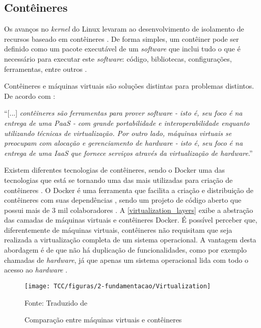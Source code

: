 \subsection{Contêineres}

Os avanços no \textit{kernel} do Linux levaram ao desenvolvimento de isolamento de recursos baseado em contêineres \cite{containersXvms}. De forma simples, um contêiner pode ser definido como um pacote executável de um \textit{software} que inclui tudo o que é necessário para executar este \textit{software}: código, bibliotecas, configurações, ferramentas, entre outros \cite{aboutcontainer}. 

Contêineres e máquinas virtuais são soluções distintas para problemas distintos. De acordo com :

\begin{citacao}
``[...] \textit{contêineres são ferramentas para prover software - isto é, seu foco é na entrega de uma PaaS - com grande portabilidade e interoperabilidade enquanto utilizando técnicas de virtualização. Por outro lado, máquinas virtuais se preocupam com alocação e gerenciamento de hardware - isto é, seu foco é na entrega de uma IaaS que fornece serviços através da virtualização de hardware}.''
\end{citacao}

Existem diferentes tecnologias de contêineres, sendo o Docker uma das tecnologias que está se tornando uma das mais utilizadas para criação de contêineres \cite{openstackContainer}. O Docker é uma ferramenta que facilita a criação e distribuição de contêineres com suas dependências \cite{containers&docker}, sendo um projeto de código aberto que possui mais de 3 mil colaboradores \cite{aboutdocker}. A \autoref{virtualization_layers} exibe a abstração das camadas de máquinas virtuais e contêineres Docker. É possível perceber que, diferentemente de máquinas virtuais, contêineres não requisitam que seja realizada a virtualização completa de um sistema operacional. A vantagem desta abordagem é de que não há duplicação de funcionalidades, como por exemplo chamadas de \textit{hardware}, já que apenas um sistema operacional lida com todo o acesso ao \textit{hardware} \cite{containers&docker}.

\begin{figure}[!htpb]
	\centering
	\caption{Comparação entre máquinas virtuais e contêineres}
    \texttt{[image: TCC/figuras/2-fundamentacao/Virtualization]}
    
	Fonte: Traduzido de \cite{paascontainer}
 	\label{virtualization_layers}
\end{figure}

